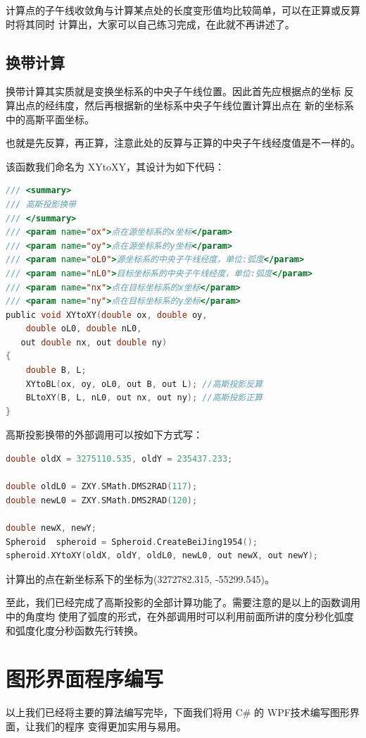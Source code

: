计算点的子午线收敛角与计算某点处的长度变形值均比较简单，可以在正算或反算时将其同时
计算出，大家可以自己练习完成，在此就不再讲述了。

\subsection{换带计算}
换带计算其实质就是变换坐标系的中央子午线位置。因此首先应根据点的坐标
反算出点的经纬度，然后再根据新的坐标系中央子午线位置计算出点在
新的坐标系中的高斯平面坐标。

也就是先反算，再正算，注意此处的反算与正算的中央子午线经度值是不一样的。

该函数我们命名为 XYtoXY，其设计为如下代码：

\begin{lstlisting}[language=C]
/// <summary>
/// 高斯投影换带
/// </summary>
/// <param name="ox">点在源坐标系的x坐标</param>
/// <param name="oy">点在源坐标系的y坐标</param>
/// <param name="oL0">源坐标系的中央子午线经度，单位:弧度</param>
/// <param name="nL0">目标坐标系的中央子午线经度，单位:弧度</param>
/// <param name="nx">点在目标坐标系的x坐标</param>
/// <param name="ny">点在目标坐标系的y坐标</param>
public void XYtoXY(double ox, double oy,
    double oL0, double nL0,
   out double nx, out double ny)
{
    double B, L;
    XYtoBL(ox, oy, oL0, out B, out L); //高斯投影反算
    BLtoXY(B, L, nL0, out nx, out ny); //高斯投影正算
}
\end{lstlisting}

高斯投影换带的外部调用可以按如下方式写：

\begin{lstlisting}[language=C]
double oldX = 3275110.535, oldY = 235437.233;

double oldL0 = ZXY.SMath.DMS2RAD(117);
double newL0 = ZXY.SMath.DMS2RAD(120);

double newX, newY;
Spheroid  spheroid = Spheroid.CreateBeiJing1954();
spheroid.XYtoXY(oldX, oldY, oldL0, newL0, out newX, out newY);
\end{lstlisting}

计算出的点在新坐标系下的坐标为(3272782.315, -55299.545)。

至此，我们已经完成了高斯投影的全部计算功能了。需要注意的是以上的函数调用中的角度均
使用了弧度的形式，在外部调用时可以利用前面所讲的度分秒化弧度和弧度化度分秒函数先行转换。

\section{图形界面程序编写}
以上我们已经将主要的算法编写完毕，下面我们将用 C\# 的 WPF技术编写图形界面，让我们的程序
变得更加实用与易用。

